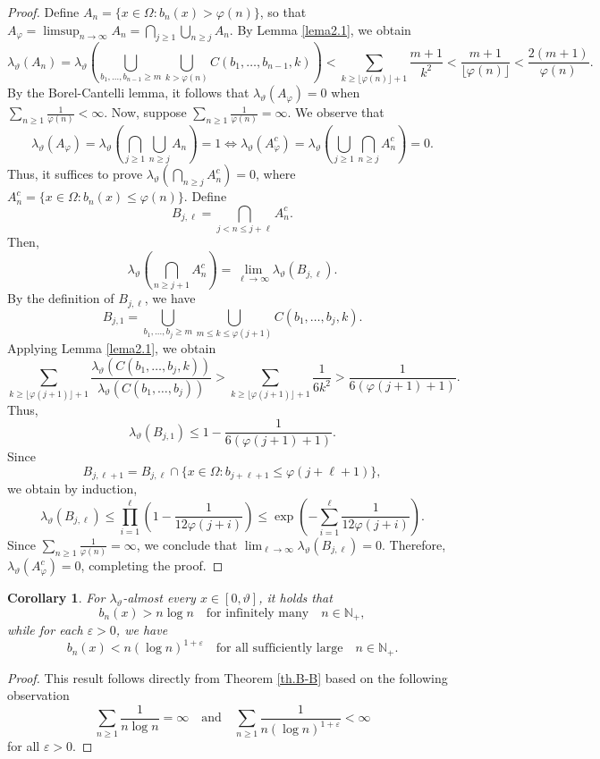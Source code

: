 \documentclass[final,1p,times]{elsarticle}
\newtheorem{corollary}[theorem]{Corollary}
\numberwithin{equation}{section}
\begin{document}
\begin{proof}
Define $A_n = \{x \in \Omega: b_n(x) > \varphi(n)\}$, so that $A_{\varphi} = \limsup_{n \to \infty} A_n = \bigcap_{j \geq 1} \bigcup_{n \geq j} A_n$. 
By Lemma \ref{lema2.1}, we obtain
\[
\lambda_{\vartheta}(A_n) = \lambda_{\vartheta}\left( \bigcup_{b_1,\ldots,b_{n-1} \geq m} \bigcup_{k>\varphi(n)} C\left(b_1, \ldots, b_{n-1}, k\right)\right)
< \sum_{k \geq \lfloor \varphi(n) \rfloor+1} \frac{m+1}{k^2} < \frac{m+1}{\lfloor \varphi(n) \rfloor} < \frac{2(m+1)}{\varphi(n)}.
\]
By the Borel-Cantelli lemma, it follows that $\lambda_{\vartheta} (A_{\varphi}) = 0$ when $\sum_{n \geq 1} \frac{1}{\varphi(n)} < \infty$.
Now, suppose $\sum_{n \geq 1} \frac{1}{\varphi(n)} = \infty$. We observe that
\[
\lambda_{\vartheta} (A_{\varphi}) = \lambda_{\vartheta} \left( \bigcap_{j\geq 1} \bigcup_{n \geq j} A_n\right)  =1 \iff 
\lambda_{\vartheta} (A^c_{\varphi}) = \lambda_{\vartheta} \left( \bigcup_{j\geq 1} \bigcap_{n \geq j} A^c_n\right) = 0.
\]
Thus, it suffices to prove $\lambda_{\vartheta} \left(\bigcap_{n \geq j} A^c_n \right)=0$, where
$A^c_n = \{x \in \Omega: b_n(x) \leq \varphi (n) \}$.
Define
\[
B_{j,\ell} = \bigcap_{j<n \leq j+\ell} A^c_n.
\]
Then,
\[
\lambda_{\vartheta}\left(\bigcap_{n \geq j+1} A^c_n \right) = \lim_{\ell \to \infty} \lambda_{\vartheta} (B_{j,\ell}).
\]
By the definition of $B_{j, \ell}$, we have
\[
B_{j,1} = \bigcup_{b_1,\ldots,b_{j} \geq m} \bigcup_{m \leq k \leq \varphi(j+1)} C\left(b_1, \ldots, b_{j}, k\right).
\]
Applying Lemma \ref{lema2.1}, we obtain
\[
\sum_{k \geq \lfloor \varphi(j+1)\rfloor+1} \frac{\lambda_{\vartheta}\left(C\left(b_1, \ldots, b_j, k\right)\right)}{\lambda_{\vartheta}\left(C\left(b_1, \ldots, b_j\right)\right)} > 
\sum_{k \geq \lfloor \varphi(j+1)\rfloor+1} \frac{1}{6k^2} > \frac{1}{6(\varphi(j+1)+1)}.
\]
Thus,
\[
\lambda_{\vartheta} (B_{j,1}) \leq 1 - \frac{1}{6(\varphi(j+1)+1)}.
\]
Since
\[
B_{j, \ell+1} = B_{j, \ell} \cap \{x \in \Omega: b_{j+\ell+1} \leq \varphi (j+\ell+1)\},
\]
we obtain by induction,
\[
\lambda_{\vartheta} (B_{j,\ell}) \leq \prod^{\ell}_{i=1} \left( 1 - \frac{1}{12\varphi(j+i)}\right) 
\leq \exp\left(-\sum_{i=1}^{\ell} \frac{1}{12\varphi(j+i)}\right).
\]
Since $\sum_{n \geq 1} \frac{1}{\varphi(n)} = \infty$, we conclude that $\lim_{\ell \to \infty} \lambda_{\vartheta} (B_{j,\ell})=0$. 
Therefore, $\lambda_{\vartheta} (A^c_{\varphi}) = 0$, completing the proof.
\end{proof}

%
\begin{corollary} \label{cor.3.2}
For $\lambda_{\vartheta}$-almost every $x \in [0, \vartheta]$, it holds that 
\[
b_n(x) > n \log n \quad \text{for infinitely many} \quad n \in \mathbb{N}_+,
\]
while for each $\varepsilon > 0$, we have 
\[
b_n(x) < n (\log n)^{1 + \varepsilon} \quad \text{for all sufficiently large} \quad n \in \mathbb{N}_+.
\]
\end{corollary}
%
%
%
\begin{proof}
This result follows directly from Theorem \ref{th.B-B} based on the following observation 
\[
\sum_{n \geq 1} \frac{1}{n \log n} = \infty \quad \text{and} \quad \sum_{n \geq 1} \frac{1}{n (\log n)^{1 + \varepsilon}} < \infty
\]
for all $\varepsilon > 0$.
\end{proof}
\end{document}
